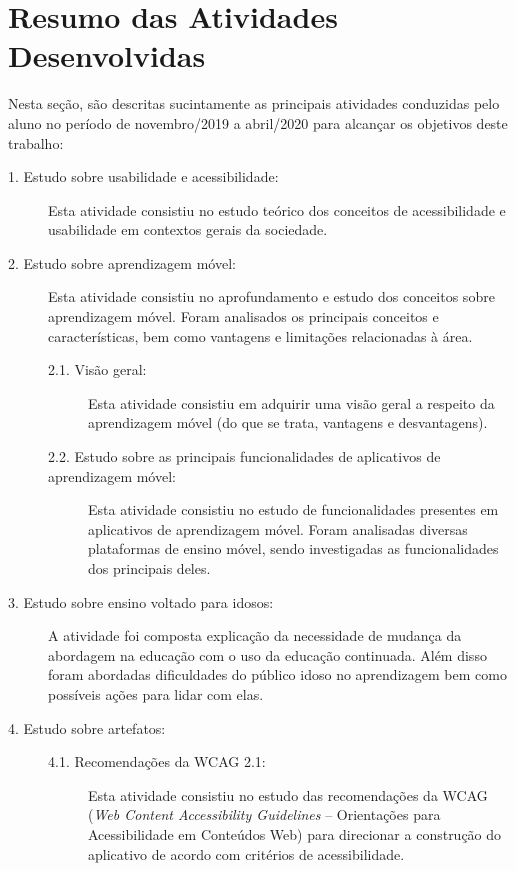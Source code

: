 \chapter{Resumo das Atividades Desenvolvidas} \label{sec:resumo_ativ}
Nesta seção, são descritas sucintamente as principais atividades conduzidas pelo aluno no período de novembro/2019 a abril/2020 para alcançar os objetivos deste trabalho:

\begin{description}
\item[1. Estudo sobre usabilidade e acessibilidade:]
Esta atividade consistiu no estudo teórico dos conceitos de acessibilidade e usabilidade em contextos gerais da sociedade.

\item[2. Estudo sobre aprendizagem móvel:] Esta atividade consistiu no aprofundamento e estudo dos conceitos sobre aprendizagem móvel. Foram analisados os principais conceitos e características, bem como vantagens e limitações relacionadas à área. 

\begin{description}
    \item[2.1. Visão geral:]
    Esta atividade consistiu em adquirir uma visão geral a respeito da aprendizagem móvel (do que se trata, vantagens e desvantagens).
    
    \item[2.2. Estudo sobre as principais funcionalidades de aplicativos de aprendizagem móvel:]
    Esta atividade consistiu no estudo de funcionalidades presentes em aplicativos de aprendizagem móvel. Foram analisadas diversas plataformas de ensino móvel, sendo investigadas as funcionalidades dos principais deles.
\end{description}

\item[3. Estudo sobre ensino voltado para idosos:]
A atividade foi composta explicação da necessidade de mudança da abordagem na educação com o uso da educação continuada. Além disso foram abordadas dificuldades do público idoso no aprendizagem bem como possíveis ações para lidar com elas.

\item[4. Estudo sobre artefatos:]
\hfill

\begin{description}
    \item[4.1. Recomendações da WCAG 2.1:]
    Esta atividade consistiu no estudo das recomendações da WCAG (\textit{Web Content Accessibility Guidelines} -- Orientações para Acessibilidade em Conteúdos Web) para direcionar a construção do aplicativo de acordo com critérios de acessibilidade.
    

\end{description}
\end{description}

